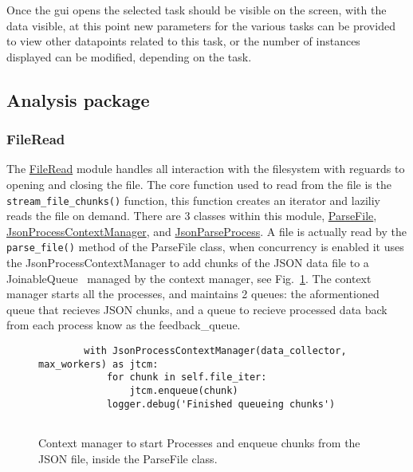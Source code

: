 \documentclass[11pt]{article}
\newcommand{\code}[1]{\colorbox{light-gray}{\texttt{#1}}}
\begin{document}
Once the gui opens the selected task should be visible on the screen, with the data visible, at this point new parameters for the various tasks can be provided to view other datapoints related to this task, or the number of instances displayed can be modified, depending on the task.

\subsection{Analysis package}
\subsubsection{FileRead}\label{sec:FileRead}
The \href{https://www2.macs.hw.ac.uk/~sf52/DocuTrace/html/DocuTrace.Analysis.html#module-DocuTrace.Analysis.FileRead}{FileRead} module handles all interaction with the filesystem with reguards to opening and closing the file. The core function used to read from the file is the \code{stream\_file\_chunks()} function, this function creates an iterator and laziliy reads the file on demand. 
There are 3 classes within this module, \href{https://www2.macs.hw.ac.uk/~sf52/DocuTrace/html/DocuTrace.Analysis.html#DocuTrace.Analysis.FileRead.ParseFile}{ParseFile}, \href{https://www2.macs.hw.ac.uk/~sf52/DocuTrace/html/DocuTrace.Analysis.html#DocuTrace.Analysis.FileRead.JsonProcessContextManager}{JsonProcessContextManager}, and \href{https://www2.macs.hw.ac.uk/~sf52/DocuTrace/html/DocuTrace.Analysis.html#DocuTrace.Analysis.FileRead.ParseFile}{JsonParseProcess}. 
A file is actually read by the \code{parse\_file()} method of the ParseFile class, when concurrency is enabled it uses the JsonProcessContextManager to add chunks of the JSON data file to a JoinableQueue~\autocite{MultiprocessingProcessbasedParallelism} managed by the context manager, see Fig.~\ref{fig:JSONPContextManager}.
The context manager starts all the processes, and maintains 2 queues: the aformentioned queue that recieves JSON chunks, and a queue to recieve processed data back from each process know as the feedback\_queue.

\begin{figure}[h]
    \begin{verbatim}
        with JsonProcessContextManager(data_collector, max_workers) as jtcm:
            for chunk in self.file_iter:
                jtcm.enqueue(chunk)
            logger.debug('Finished queueing chunks')
        
    \end{verbatim}
    \caption{Context manager to start Processes and enqueue chunks from the JSON file, inside the ParseFile class.}
    \label{fig:JSONPContextManager}
\end{figure}
\end{document}
